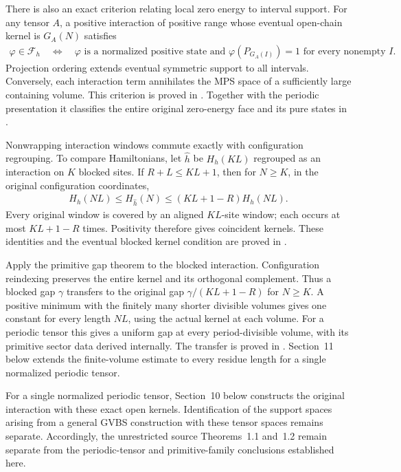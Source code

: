 \documentclass{article}
\begin{document}
There is also an exact criterion relating local zero energy to interval
support. For any tensor $A$, a positive interaction of positive range whose
eventual open-chain kernel is $G_A(N)$ satisfies
\begin{align}
  \varphi\in\mathcal F_h
  \quad\Longleftrightarrow\quad
  \varphi\text{ is a normalized positive state and }
  \varphi(P_{G_A(I)})=1\text{ for every nonempty }I.
\end{align}
Projection ordering extends eventual symmetric support to all intervals.
Conversely, each interaction term annihilates the MPS space of a sufficiently
large containing volume. This criterion is proved in
.
Together with the periodic presentation it classifies the entire original
zero-energy face and its pure states in
.

Nonwrapping interaction windows commute exactly with configuration
regrouping. To compare Hamiltonians, let $\widehat h$ be $H_h(KL)$
regrouped as an interaction on $K$ blocked sites. If $R+L\leq KL+1$,
then for $N\geq K$, in the original configuration coordinates,
\begin{align}
  H_h(NL)\leq H_{\widehat h}(N)
    \leq (KL+1-R)H_h(NL).
\end{align}
Every original window is covered by an aligned $KL$-site window; each
occurs at most $KL+1-R$ times. Positivity therefore gives coincident
kernels. These identities and the eventual blocked kernel condition are
proved in
.

Apply the primitive gap theorem to the blocked interaction. Configuration
reindexing preserves the entire kernel and its orthogonal complement. Thus
a blocked gap $\gamma$ transfers to the original gap
$\gamma/(KL+1-R)$ for $N\geq K$. A positive minimum with the finitely
many shorter divisible volumes gives one constant for every length $NL$,
using the actual kernel at each volume. For a periodic tensor this gives a
uniform gap at every period-divisible volume, with its primitive sector
data derived internally. The transfer is proved in
.
Section~11 below extends the finite-volume estimate to every residue
length for a single normalized periodic tensor.

For a single normalized periodic tensor, Section~10 below constructs the
original interaction with these exact open kernels. Identification of the
support spaces arising from a general GVBS construction with these tensor
spaces remains separate.
Accordingly, the unrestricted source Theorems~1.1 and~1.2 remain separate
from the periodic-tensor and primitive-family conclusions established here.
\end{document}
